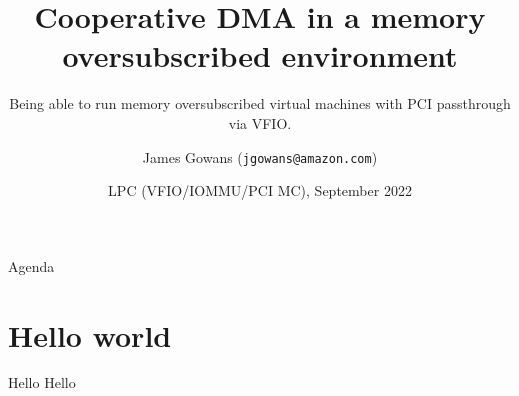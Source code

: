 \documentclass{beamer}
\title{Cooperative DMA in a memory oversubscribed environment}
\subtitle{Being able to run memory oversubscribed virtual machines with PCI passthrough via VFIO.}
\author[James Gowans (EC2) ]{James Gowans (\texttt{jgowans@amazon.com})}
\institute{Amazon / AWS / EC2}
\date{LPC (VFIO/IOMMU/PCI MC), September 2022}
\begin{document}
\begin{frame}
\titlepage
\end{frame}


\begin{frame}{Agenda}
  \tableofcontents[hideallsubsections]
\end{frame}


\section{Hello world}

\begin{frame}{Hello}
  Hello
\end{frame}
\end{document}
